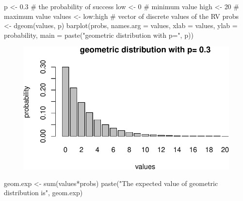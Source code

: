 \documentclass[
  letterpaper,
  DIV=11,
  numbers=noendperiod]{scrreprt}
\newenvironment{Shaded}{\begin{snugshade}}{\end{snugshade}}
\newcommand{\AttributeTok}[1]{\textcolor[rgb]{0.40,0.45,0.13}{#1}}
\newcommand{\CommentTok}[1]{\textcolor[rgb]{0.37,0.37,0.37}{#1}}
\newcommand{\DecValTok}[1]{\textcolor[rgb]{0.68,0.00,0.00}{#1}}
\newcommand{\FloatTok}[1]{\textcolor[rgb]{0.68,0.00,0.00}{#1}}
\newcommand{\FunctionTok}[1]{\textcolor[rgb]{0.28,0.35,0.67}{#1}}
\newcommand{\NormalTok}[1]{\textcolor[rgb]{0.00,0.23,0.31}{#1}}
\newcommand{\OtherTok}[1]{\textcolor[rgb]{0.00,0.23,0.31}{#1}}
\newcommand{\SpecialCharTok}[1]{\textcolor[rgb]{0.37,0.37,0.37}{#1}}
\newcommand{\StringTok}[1]{\textcolor[rgb]{0.13,0.47,0.30}{#1}}
\begin{document}
\begin{Shaded}
\begin{Highlighting}[]
\NormalTok{p }\OtherTok{\textless{}{-}} \FloatTok{0.3} \CommentTok{\# the probability of success}
\NormalTok{low }\OtherTok{\textless{}{-}} \DecValTok{0} \CommentTok{\# minimum value}
\NormalTok{high }\OtherTok{\textless{}{-}} \DecValTok{20} \CommentTok{\# maximum value}
\NormalTok{values }\OtherTok{\textless{}{-}}\NormalTok{ low}\SpecialCharTok{:}\NormalTok{high }\CommentTok{\# vector of discrete values of the RV}
\NormalTok{probs }\OtherTok{\textless{}{-}} \FunctionTok{dgeom}\NormalTok{(values, p)}
\FunctionTok{barplot}\NormalTok{(probs, }\AttributeTok{names.arg =}\NormalTok{ values, }\AttributeTok{xlab =} \StringTok{\textquotesingle{}values\textquotesingle{}}\NormalTok{, }\AttributeTok{ylab =} \StringTok{\textquotesingle{}probability\textquotesingle{}}\NormalTok{, }\AttributeTok{main =} \FunctionTok{paste}\NormalTok{(}\StringTok{"geometric distribution with p="}\NormalTok{, p))}
\end{Highlighting}
\end{Shaded}

\begin{figure}[H]

{\centering \includegraphics{./04-distributions_files/figure-pdf/unnamed-chunk-5-1.pdf}

}

\end{figure}

\begin{Shaded}
\begin{Highlighting}[]
\NormalTok{geom.exp }\OtherTok{\textless{}{-}} \FunctionTok{sum}\NormalTok{(values}\SpecialCharTok{*}\NormalTok{probs)}
\FunctionTok{paste}\NormalTok{(}\StringTok{"The expected value of geometric distribution is"}\NormalTok{, geom.exp)}
\end{Highlighting}
\end{Shaded}
\end{document}
